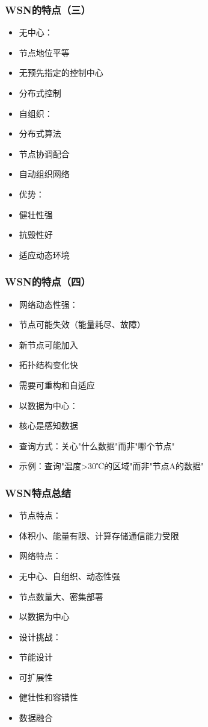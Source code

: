 \documentclass[aspectratio=43]{beamer}
\begin{document}
\begin{frame}
  \frametitle{WSN的特点（三）}

  \begin{itemize}
  \item<+-> 无中心：
  \item<+-> 节点地位平等
  \item<+-> 无预先指定的控制中心
  \item<+-> 分布式控制
  \item<+-> 自组织：
  \item<+-> 分布式算法
  \item<+-> 节点协调配合
  \item<+-> 自动组织网络
  \item<+-> 优势：
  \item<+-> 健壮性强
  \item<+-> 抗毁性好
  \item<+-> 适应动态环境
  \end{itemize}
\end{frame}

\begin{frame}
  \frametitle{WSN的特点（四）}

  \begin{itemize}
  \item<+-> 网络动态性强：
  \item<+-> 节点可能失效（能量耗尽、故障）
  \item<+-> 新节点可能加入
  \item<+-> 拓扑结构变化快
  \item<+-> 需要可重构和自适应
  \item<+-> 以数据为中心：
  \item<+-> 核心是感知数据
  \item<+-> 查询方式：关心"什么数据"而非"哪个节点"
  \item<+-> 示例：查询"温度>30℃的区域"而非"节点A的数据"
  \end{itemize}
\end{frame}

\begin{frame}
  \frametitle{WSN特点总结}

  \begin{itemize}
  \item<+-> 节点特点：
  \item<+-> 体积小、能量有限、计算存储通信能力受限
  \item<+-> 网络特点：
  \item<+-> 无中心、自组织、动态性强
  \item<+-> 节点数量大、密集部署
  \item<+-> 以数据为中心
  \item<+-> 设计挑战：
  \item<+-> 节能设计
  \item<+-> 可扩展性
  \item<+-> 健壮性和容错性
  \item<+-> 数据融合
  \end{itemize}
\end{frame}
\end{document}
